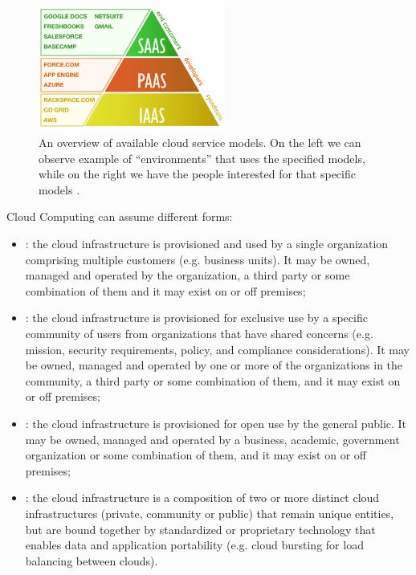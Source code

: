 \begin{figure}
	\centering{}
	\includegraphics[width=0.55\textwidth]{chapters/background/images/cloud-service-models.png}
	\caption[Available service models in cloud computing]{An overview of available cloud service models. On the
		left we can observe example of ``environments'' that uses the specified models, while on the right we
		have the people interested for that specific models \cite{cloudServiceModels}.}
	\label{img:background-cloudComputing-serviceModels}
\end{figure}

Cloud Computing can assume different forms:

\begin{itemize}
	\item{: the cloud infrastructure is provisioned and used by a single organization
		comprising multiple customers (e.g. business units). It may be owned, managed and operated by the
		organization, a third party or some combination of them and it may exist on or off premises;}
	\item{: the cloud infrastructure is provisioned for exclusive use by a specific
		community of users from organizations that have shared concerns (e.g. mission, security requirements,
		policy, and compliance considerations). It may be owned, managed and operated by one or more of
		the organizations in the community, a third party or some combination of them, and it may exist on
		or off premises;}
	\item{: the cloud infrastructure is provisioned for open use by the general
		public. It may be owned, managed and operated by a business, academic, government organization or
		some combination of them, and it may exist on or off premises;}
	\item{: the cloud infrastructure is a composition of two or more distinct
		cloud infrastructures (private, community or public) that remain unique entities, but are bound
		together by standardized or proprietary technology that enables data and application portability
		(e.g. cloud bursting for load balancing between clouds).}
\end{itemize}

